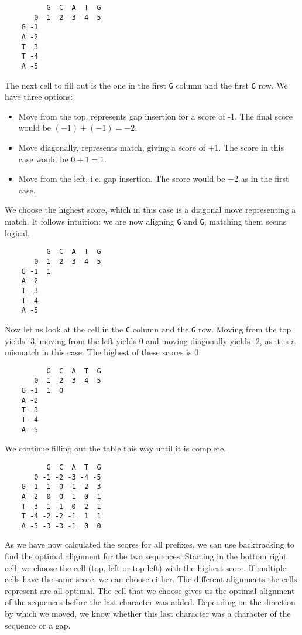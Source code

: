 \begin{verbatim}
          G  C  A  T  G
       0 -1 -2 -3 -4 -5
    G -1
    A -2
    T -3
    T -4
    A -5
\end{verbatim}

The next cell to fill out is the one in the first \verb|G| column and the first \verb|G| row. We have three options:

\begin{itemize}
    \item Move from the top, represents gap insertion for a score of -1. The final score would be $(-1) + (-1) = -2$.
    \item Move diagonally, represents match, giving a score of +1. The score in this case would be $0 + 1 = 1$.
    \item Move from the left, i.e. gap insertion. The score would be $-2$ as in the first case.
\end{itemize}

We choose the highest score, which in this case is a diagonal move representing a match. It follows intuition: we are now aligning
\verb|G| and \verb|G|, matching them seems logical.

\begin{verbatim}
          G  C  A  T  G
       0 -1 -2 -3 -4 -5
    G -1  1
    A -2
    T -3
    T -4
    A -5
\end{verbatim}

Now let us look at the cell in the \verb|C| column and the \verb|G| row. Moving from the top yields -3, moving from the left yields
0 and moving diagonally yields -2, as it is a mismatch in this case. The highest of these scores is 0.

\begin{verbatim}
          G  C  A  T  G
       0 -1 -2 -3 -4 -5
    G -1  1  0
    A -2
    T -3
    T -4
    A -5
\end{verbatim}

We continue filling out the table this way until it is complete.

\begin{verbatim}
          G  C  A  T  G
       0 -1 -2 -3 -4 -5
    G -1  1  0 -1 -2 -3
    A -2  0  0  1  0 -1
    T -3 -1 -1  0  2  1
    T -4 -2 -2 -1  1  1
    A -5 -3 -3 -1  0  0
\end{verbatim}

As we have now calculated the scores for all prefixes, we can use backtracking to find the optimal alignment for the two sequences.
Starting in the bottom right cell, we choose the cell (top, left or top-left) with the highest score. If multiple cells have the same score, we can 
choose either. The different alignments the cells represent are all optimal. The cell that we choose gives us the optimal alignment
of the sequences before the last character was added. Depending on the direction by which we moved, we know whether this last character
was a character of the sequence or a gap.

